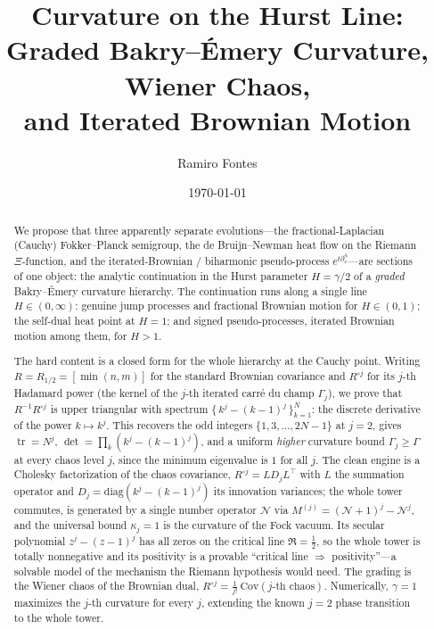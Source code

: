 \documentclass[11pt,reqno]{amsart}
\title[Curvature on the Hurst line]{Curvature on the Hurst Line:\\
Graded Bakry--\'Emery Curvature, Wiener Chaos,\\
and Iterated Brownian Motion}
\author{Ramiro Fontes}
\date{\today}
\theoremstyle{plain}
\theoremstyle{definition}
\theoremstyle{remark}
\newcommand{\Had}{\circ}
\DeclareMathOperator{\tr}{tr}
\begin{document}
\begin{abstract}
We propose that three apparently separate evolutions---the
fractional-Laplacian (Cauchy) Fokker--Planck semigroup, the de
Bruijn--Newman heat flow on the Riemann $\Xi$-function, and the
iterated-Brownian / biharmonic pseudo-process $e^{t\partial_x^4}$---are
sections of one object: the analytic continuation in the Hurst
parameter $H=\gamma/2$ of a \emph{graded} Bakry--\'Emery curvature
hierarchy. The continuation runs along a single line $H\in(0,\infty)$:
genuine jump processes and fractional Brownian motion for $H\in(0,1)$;
the self-dual heat point at $H=1$; and signed pseudo-processes,
iterated Brownian motion among them, for $H>1$.

The hard content is a closed form for the whole hierarchy at the
Cauchy point. Writing $R=R_{1/2}=[\min(n,m)]$ for the standard
Brownian covariance and $R^{\Had j}$ for its $j$-th Hadamard power
(the kernel of the $j$-th iterated carr\'e du champ $\Gamma_j$), we
prove that $R^{-1}R^{\Had j}$ is upper triangular with spectrum
$\{\,k^{j}-(k-1)^{j}\,\}_{k=1}^N$: the discrete derivative of the
power $k\mapsto k^j$. This recovers the odd integers $\{1,3,\dots,2N-1\}$
at $j=2$, gives $\tr=N^j$, $\det=\prod_k(k^j-(k-1)^j)$, and a uniform
\emph{higher} curvature bound $\Gamma_j\ge\Gamma$ at every chaos level
$j$, since the minimum eigenvalue is $1$ for all $j$. The clean engine
is a Cholesky factorization of the chaos covariance,
$R^{\Had j}=LD_jL^{\top}$ with $L$ the summation operator and
$D_j=\mathrm{diag}(k^j-(k-1)^j)$ its innovation variances; the whole
tower commutes, is generated by a single number operator
$\mathcal N$ via $M^{(j)}=(\mathcal N+1)^j-\mathcal N^j$, and the
universal bound $\kappa_j=1$ is the curvature of the Fock vacuum.
Its secular polynomial $z^j-(z-1)^j$ has all zeros on the critical line
$\Re=\tfrac12$, so the whole tower is totally nonnegative and its
positivity is a provable ``critical line $\Rightarrow$ positivity''---a
solvable model of the mechanism the Riemann hypothesis would need.
The grading is
the Wiener chaos of the Brownian dual, $R^{\Had j}=\tfrac1{j!}\,
\mathrm{Cov}(j\text{-th chaos})$. Numerically, $\gamma=1$ maximizes the
$j$-th curvature for every $j$, extending the known $j=2$ phase
transition to the whole tower.


\end{abstract}
\end{document}
